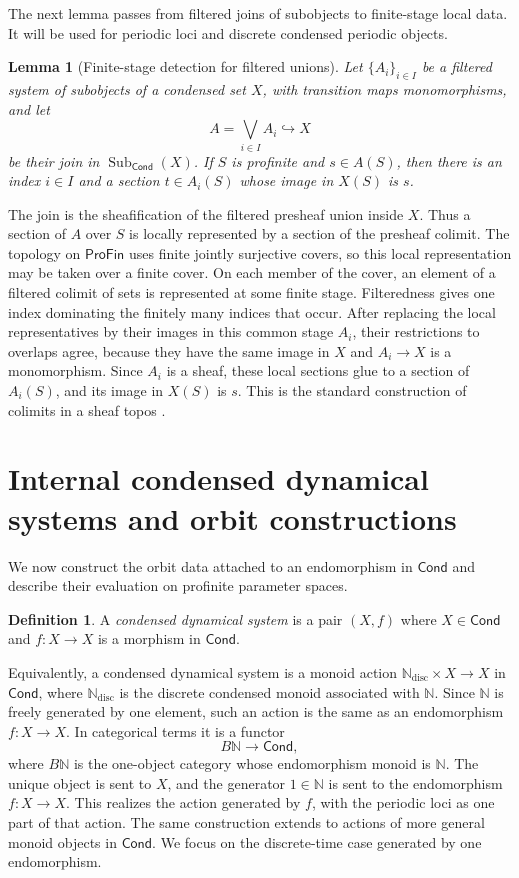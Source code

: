 \documentclass[10pt]{amsart}
\makeatletter
\newcommand{\ProFin}{\mathsf{ProFin}}
\newcommand{\Cond}{\mathsf{Cond}}
\newcommand{\Sub}{\operatorname{Sub}}
\newcommand{\N}{\mathbb{N}}
\newcommand{\Ndisc}{\mathbb{N}_{\mathrm{disc}}}
\theoremstyle{plain}
\newtheorem{lemma}[theorem]{Lemma}
\theoremstyle{definition}
\newtheorem{definition}[theorem]{Definition}
\renewenvironment{proof}[1][\proofname]{\par
  \pushQED{\qed}%
  \normalfont \topsep6\p@\@plus6\p@\relax
  \trivlist
  \item[\hskip\labelsep\itshape #1\@addpunct{:}]\ignorespaces
}{%
  \popQED\endtrivlist\@endpefalse
}
\makeatother
\begin{document}
The next lemma passes from filtered joins of subobjects to finite-stage local
data. It will be used for periodic loci and discrete condensed periodic objects.

\begin{lemma}[Finite-stage detection for filtered unions]
\label{lem:finite-stage-detection}
Let $\{A_i\}_{i\in I}$ be a filtered system of subobjects of a condensed set
$X$, with transition maps monomorphisms, and let
\[
  A=\bigvee_{i\in I}A_i\hookrightarrow X
\]
be their join in $\Sub_{\Cond}(X)$. If $S$ is profinite and $s\in A(S)$, then
there is an index $i\in I$ and a section $t\in A_i(S)$ whose image in $X(S)$ is
$s$.
\end{lemma}

\begin{proof}
The join is the sheafification of the filtered presheaf union inside $X$.
Thus a section of $A$ over $S$ is locally represented by a section of the
presheaf colimit. The topology on $\ProFin$ uses finite jointly surjective
covers, so this local representation may be taken over a finite cover. On each
member of the cover, an element of a filtered colimit of sets is represented at
some finite stage. Filteredness gives one index dominating the finitely many
indices that occur. After replacing the local representatives by their images
in this common stage $A_i$, their restrictions to overlaps agree, because they
have the same image in $X$ and $A_i\to X$ is a monomorphism. Since $A_i$ is a
sheaf, these local sections glue to a section of $A_i(S)$, and its image in
$X(S)$ is $s$. This is the standard construction of colimits in a sheaf topos
\cite{MacLaneMoerdijk,JohnstoneTopos}.
\end{proof}

\section{Internal condensed dynamical systems and orbit constructions}
\label{sec:systems}

We now construct the orbit data attached to an endomorphism in $\Cond$ and
describe their evaluation on profinite parameter spaces.

\begin{definition}
A \emph{condensed dynamical system} is a pair $(X,f)$ where $X\in\Cond$ and
$f:X\to X$ is a morphism in $\Cond$.
\end{definition}

Equivalently, a condensed dynamical system is a monoid action
$\Ndisc\times X\to X$ in $\Cond$, where $\Ndisc$ is the discrete condensed
monoid associated with $\N$. Since $\N$ is freely generated by one element,
such an action is the same as an endomorphism $f:X\to X$. In
categorical terms it is a functor
\[
  B\N\longrightarrow \Cond,
\]
where $B\N$ is the one-object category whose endomorphism monoid is $\N$. The
unique object is sent to $X$, and the generator $1\in\N$ is sent to the
endomorphism $f:X\to X$. This realizes the action generated by $f$, with the
periodic loci as one part of that action.
The same construction extends to actions of more general monoid objects in
$\Cond$. We focus on the discrete-time case generated by one endomorphism.
\end{document}
